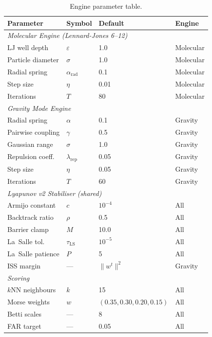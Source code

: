 \documentclass[final]{siamltex}
\newcommand{\norm}[1]{\lVert #1 \rVert}
\begin{document}
\begin{appendix}
\begin{table}[htbp]
\centering
\caption{Engine parameter table.}
\label{tab:params}
\begin{tabular}{llll}
\toprule
Parameter & Symbol & Default & Engine\\\midrule
\multicolumn{4}{l}{\textit{Molecular Engine (Lennard-Jones 6--12)}}\\
LJ well depth     & $\varepsilon$ & 1.0 & Molecular\\
Particle diameter & $\sigma$      & 1.0 & Molecular\\
Radial spring     & $\alpha_{\mathrm{rad}}$ & 0.1 & Molecular\\
Step size         & $\eta$        & 0.01 & Molecular\\
Iterations        & $T$           & 80   & Molecular\\
\midrule
\multicolumn{4}{l}{\textit{Gravity Mode Engine}}\\
Radial spring     & $\alpha$      & 0.1  & Gravity\\
Pairwise coupling & $\gamma$      & 0.5  & Gravity\\
Gaussian range    & $\sigma$      & 1.0  & Gravity\\
Repulsion coeff.  & $\lambda_{\mathrm{rep}}$ & 0.05 & Gravity\\
Step size         & $\eta$        & 0.05 & Gravity\\
Iterations        & $T$           & 60   & Gravity\\
\midrule
\multicolumn{4}{l}{\textit{Lyapunov v2 Stabiliser (shared)}}\\
Armijo constant   & $c$           & $10^{-4}$ & All\\
Backtrack ratio   & $\rho$        & 0.5  & All\\
Barrier clamp     & $M$           & 10.0 & All\\
La~Salle tol.     & $\tau_{\mathrm{LS}}$ & $10^{-5}$ & All\\
La~Salle patience & $P$           & 5    & All\\
ISS margin        & ---           & $\norm{w^t}^2$ & Gravity\\
\midrule
\multicolumn{4}{l}{\textit{Scoring}}\\
$k$NN neighbours  & $k$           & 15   & All\\
Morse weights     & $w$           & $(0.35,0.30,0.20,0.15)$ & All\\
Betti scales      & ---           & 8    & All\\
FAR target        & ---           & 0.05 & All\\
\bottomrule
\end{tabular}
\end{table}


\end{appendix}
\end{document}
